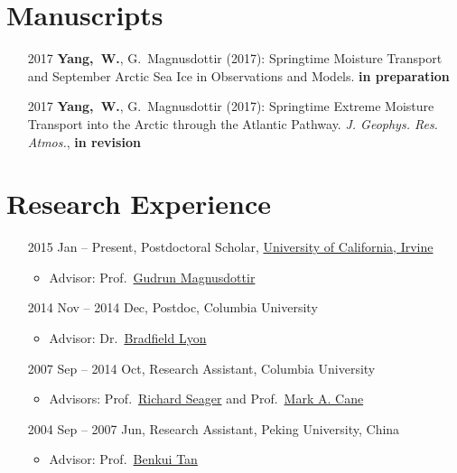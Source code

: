 \documentclass[11pt]{article}
\newcommand{\uci}{\href{http://www.uci.edu}{University of California, Irvine}}
\newcommand{\benkui}{\href{http://www.phy.pku.edu.cn/personnel/das/bktan.xml}{Benkui Tan}}
\newcommand{\richard}{\href{http://www.ldeo.columbia.edu/res/div/ocp/people/seager/}{Richard Seager}}
\newcommand{\cane}{\href{http://www.ldeo.columbia.edu/user/mcane}{Mark A. Cane}}
\newcommand{\brad}{\href{http://climatechange.umaine.edu/people/profile/bradfield_lyon}
{Bradfield Lyon}}
\newcommand{\gudrun}{\href{http://sites.uci.edu/magnusdottir}{Gudrun Magnusdottir}}
\begin{document}
\section{Manuscripts}
\begin{itemize}[leftmargin=10ex]
	\item[2017] \textbf{Yang,~W.}, G.~Magnusdottir (2017): Springtime Moisture Transport and September Arctic Sea Ice in Observations and Models. \textbf{in preparation}
	
	\item[2017] \textbf{Yang,~W.}, G.~Magnusdottir (2017): Springtime Extreme Moisture Transport into the Arctic through the Atlantic Pathway. \emph{J. Geophys. Res. Atmos.}, \textbf{in revision}
\end{itemize}


\section{Research Experience}
\begin{itemize}[leftmargin=10ex]
	\item[2015]Jan -- Present, Postdoctoral Scholar, \uci{}
	\begin{itemize}[leftmargin=0ex]
		\item  Advisor: Prof.~\gudrun{}
		\end{itemize}
	\item[2014]Nov -- 2014 Dec, Postdoc, Columbia University
	\begin{itemize}[leftmargin=0ex]
		\item  Advisor: Dr.~\brad{}
		\end{itemize}
	\item[2007] Sep -- 2014 Oct,  Research  Assistant, Columbia University
	\begin{itemize}[leftmargin=0ex]
		\item  Advisors: Prof.~\richard{} and Prof.~\cane{}
		\end{itemize}
	\item[2004] Sep -- 2007 Jun, Research  Assistant, Peking University, China
	\begin{itemize}[leftmargin=0ex]
		\item  Advisor: Prof.~\benkui{}
		\end{itemize}
	\end{itemize}
\end{document}
